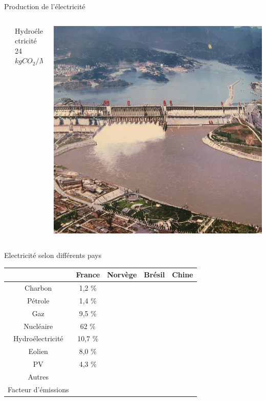 \documentclass{beamer}
\begin{document}
\begin{frame}{Production de l'électricité}
\begin{columns}
\begin{column}{0.2\textwidth}
\end{column}
\begin{column}{0.25\textwidth}
Hydroélectricité\\
24 $kgCO_2/MWh$
\end{column}
\begin{column}{0.2\textwidth}
  \includegraphics[scale=0.1]{images/3_gorges.jpg}
\end{column}
\end{columns}
\end{frame}

\begin{frame}{Electricité selon différents pays}
\begin{tabular}{c|c|c|c|c}
 & France & Norvège & Brésil & Chine \\ \hline
Charbon &1,2 \% \\ 
Pétrole &1,4 \% \\
Gaz &9,5 \% \\
Nucléaire & 62 \% \\
Hydroélectricité & 10,7 \% \\
 Eolien &8,0 \% \\
  PV &4,3 \% \\
  Autres & \\ \hline
  Facteur d'émissions
\end{tabular}

\end{frame}
\end{document}

